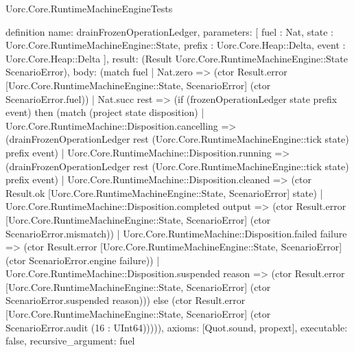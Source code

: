 \begin{lexlean}{Uorc.Core.RuntimeMachineEngineTests}
\begin{semanticmodule}
definition{
  name: drainFrozenOperationLedger,
  parameters: [
    fuel : Nat,
    state : Uorc.Core.RuntimeMachineEngine::State,
    prefix : Uorc.Core.Heap::Delta,
    event : Uorc.Core.Heap::Delta
  ],
  result: (Result Uorc.Core.RuntimeMachineEngine::State ScenarioError),
  body: (match fuel
    | Nat.zero => (ctor Result.error [Uorc.Core.RuntimeMachineEngine::State, ScenarioError] (ctor ScenarioError.fuel))
    | Nat.succ rest => (if (frozenOperationLedger state prefix event) then (match (project state disposition)
      | Uorc.Core.RuntimeMachine::Disposition.cancelling => (drainFrozenOperationLedger rest (Uorc.Core.RuntimeMachineEngine::tick state) prefix event)
      | Uorc.Core.RuntimeMachine::Disposition.running => (drainFrozenOperationLedger rest (Uorc.Core.RuntimeMachineEngine::tick state) prefix event)
      | Uorc.Core.RuntimeMachine::Disposition.cleaned => (ctor Result.ok [Uorc.Core.RuntimeMachineEngine::State, ScenarioError] state)
      | Uorc.Core.RuntimeMachine::Disposition.completed output => (ctor Result.error [Uorc.Core.RuntimeMachineEngine::State, ScenarioError] (ctor ScenarioError.mismatch))
      | Uorc.Core.RuntimeMachine::Disposition.failed failure => (ctor Result.error [Uorc.Core.RuntimeMachineEngine::State, ScenarioError] (ctor ScenarioError.engine failure))
      | Uorc.Core.RuntimeMachine::Disposition.suspended reason => (ctor Result.error [Uorc.Core.RuntimeMachineEngine::State, ScenarioError] (ctor ScenarioError.suspended reason))) else (ctor Result.error [Uorc.Core.RuntimeMachineEngine::State, ScenarioError] (ctor ScenarioError.audit (16 : UInt64))))),
  axioms: [Quot.sound, propext],
  executable: false,
  recursive_argument: fuel
}


\end{semanticmodule}
\end{lexlean}
